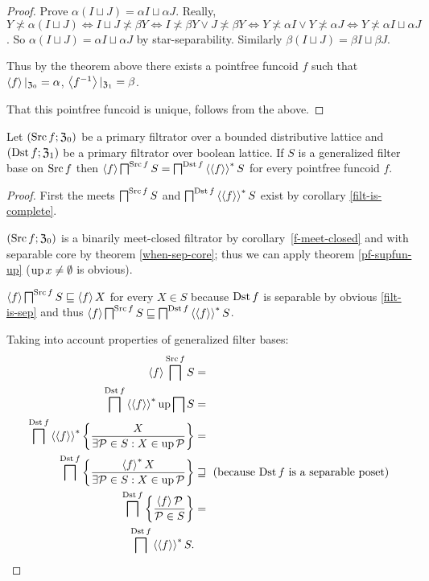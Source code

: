 \begin{proof}
Prove $\alpha(I\sqcup J)=\alpha I\sqcup\alpha J$. Really, $Y\nasymp\alpha(I\sqcup J)\Leftrightarrow I\sqcup J\nasymp\beta Y\Leftrightarrow I\nasymp\beta Y\vee J\nasymp\beta Y\Leftrightarrow Y\nasymp\alpha I\vee Y\nasymp\alpha J\Leftrightarrow Y\nasymp\alpha I\sqcup\alpha J$.
So $\alpha(I\sqcup J)=\alpha I\sqcup\alpha J$ by star-separability.
Similarly $\beta(I\sqcup J)=\beta I\sqcup\beta J$.

Thus by the theorem above there exists a pointfree funcoid $f$ such that
$\left\langle f\right\rangle|_{\mathfrak{Z}_0}=\alpha$, $\left\langle f^{-1}\right\rangle|_{\mathfrak{Z}_1}=\beta$.

That this pointfree funcoid is unique, follows from the above.\end{proof}
\begin{prop}
Let $(\operatorname{Src} f;\mathfrak{Z}_{0})$ be a primary filtrator over a bounded
distributive lattice and $(\operatorname{Dst} f;\mathfrak{Z}_{1})$ be a primary
filtrator over boolean lattice. If $S$ is a generalized filter base
on $\operatorname{Src} f$ then $\left\langle f\right\rangle\bigsqcap^{\operatorname{Src} f}S=\bigsqcap^{\operatorname{Dst} f}\left\langle \left\langle f\right\rangle\right\rangle ^{\ast}S$
for every pointfree funcoid $f$.\end{prop}
\begin{proof}
First the meets $\bigsqcap^{\operatorname{Src} f}S$ and $\bigsqcap^{\operatorname{Dst} f}\left\langle \left\langle f\right\rangle\right\rangle ^{\ast}S$
exist by corollary \ref{filt-is-complete}.

$(\operatorname{Src} f;\mathfrak{Z}_{0})$ is a binarily meet-closed filtrator by
corollary~\ref{f-meet-closed} and with separable core by theorem
\ref{when-sep-core}; thus we can apply theorem \ref{pf-supfun-up}
($\operatorname{up} x\neq\emptyset$ is obvious).

$\left\langle f\right\rangle\bigsqcap^{\operatorname{Src} f}S\sqsubseteq\left\langle f\right\rangle X$ for every $X\in S$
because $\operatorname{Dst} f$ is separable by obvious \ref{filt-is-sep} and thus
$\left\langle f\right\rangle\bigsqcap^{\operatorname{Src} f}S\sqsubseteq\bigsqcap^{\operatorname{Dst} f}\left\langle \left\langle f\right\rangle\right\rangle ^{\ast}S$.

Taking into account properties of generalized filter bases:
\begin{align*}
\left\langle f\right\rangle\bigsqcap^{\operatorname{Src} f}S & =\\
\bigsqcap^{\operatorname{Dst} f}\left\langle \left\langle f\right\rangle\right\rangle ^{\ast}\operatorname{up}\bigsqcap S & =\\
\bigsqcap^{\operatorname{Dst} f}\left\langle \left\langle f\right\rangle\right\rangle ^{\ast}\left\{ \frac{X}{\exists\mathcal{P}\in S:X\in\operatorname{up}\mathcal{P}}\right\} & =\\
\bigsqcap^{\operatorname{Dst} f}\left\{ \frac{\left\langle f\right\rangle ^{\ast}X}{\exists\mathcal{P}\in S:X\in\operatorname{up}\mathcal{P}}\right\} & \sqsupseteq\text{ (because \ensuremath{\operatorname{Dst} f} is a separable poset)}\\
\bigsqcap^{\operatorname{Dst} f}\left\{ \frac{\left\langle f\right\rangle\mathcal{P}}{\mathcal{P}\in S}\right\} & =\\
\bigsqcap^{\operatorname{Dst} f}\left\langle \left\langle f\right\rangle\right\rangle ^{\ast}S.
\end{align*}
\end{proof}
